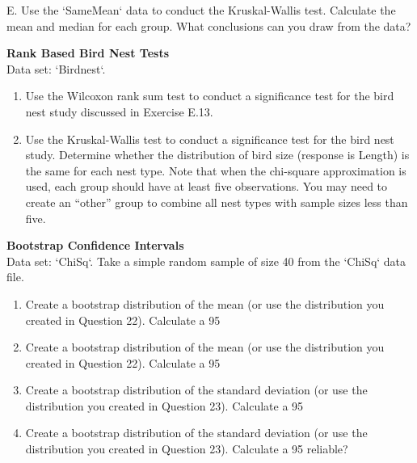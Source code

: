 \documentclass[
]{report}
\newcounter{excount}
\renewcommand{\theexcount}{E\arabic{excount}}
\begin{document}
\begin{list}{\theexcount.}{ \setlength{\itemsep}{0.5em}}
Use the `SameMean` data to conduct the Kruskal-Wallis test. Calculate the mean and median for each group. What conclusions can you draw from the data?
  
  
  
  
  \item \textbf{Rank Based Bird Nest Tests} \\
  Data set: `Birdnest`. 
  \begin{enumerate}
    \setcounter{enumi}{0}  
    \item Use the Wilcoxon rank sum test to conduct a significance test for the bird nest study discussed in
Exercise E.13.
    \item Use the Kruskal-Wallis test to conduct a significance test for the bird nest study. Determine whether the distribution of bird size (response is Length) is the same for each nest type. Note that when the chi-square approximation is used, each group should have at least five observations. You may need to create an “other” group to combine all nest types with sample sizes less
than five.
  \end{enumerate}
  
  
  
  
  \item \textbf{Bootstrap Confidence Intervals} \\
  Data set: `ChiSq`. Take a simple random sample of size 40 from the `ChiSq` data file.
  \begin{enumerate}
    \setcounter{enumi}{0}  
    \item Create a bootstrap distribution of the mean (or use the distribution you created in Question 22). Calculate a 95%
    \item Create a bootstrap distribution of the mean (or use the distribution you created in Question 22). Calculate a 95%
    \item Create a bootstrap distribution of the standard deviation (or use the distribution you created in Question 23). Calculate a 95%
    \item Create a bootstrap distribution of the standard deviation (or use the distribution you created in Question 23). Calculate a 95%
reliable?
  \end{enumerate}
  

\end{list}
\end{document}
